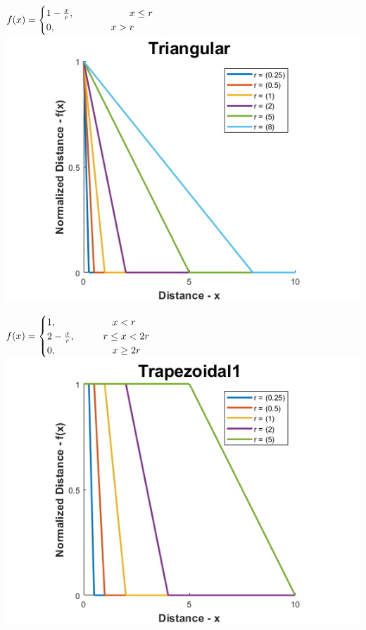 \documentclass[12pt, a4paper, titlepage, openany]{book}
\begin{document}
\begin{description}[labelsep=1cm, labelwidth=2cm, nosep,style=multiline,leftmargin=3cm]
\begin{description}[labelsep=14em, labelwidth=10em, nosep,style=multiline,leftmargin=6cm]
	\item[\texttt{"triangular"}]	  $f(x) = \begin{cases} 1 - \frac{x}{r},  \hspace{20mm}  x\le r 
	\\ 0,  \hspace{20mm}  x>r \end{cases}$\\
		\includegraphics[scale=.5]{FuzzTriv1.png} \\

	\item[\texttt{"trapezoidal1"}]	  $f(x) = \begin{cases} 1,  \hspace{20mm}  x<r 
	\\ 2 - \frac{x}{r},  \hspace{10mm} r\le x<2r 
	\\ 0,  \hspace{20mm}  x\ge 2r \end{cases}$\\
		\includegraphics[scale=.5]{FuzzTrap1v1.png} \\ 


\end{description}
\end{description}
\end{document}
